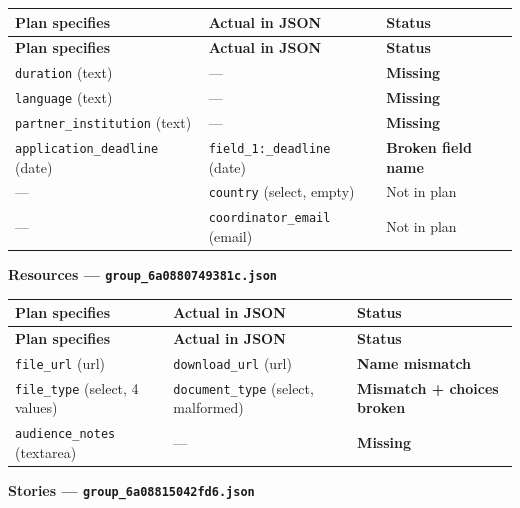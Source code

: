 \documentclass[12pt,a4paper]{article}
\begin{document}
\vspace{0.4em}
\begin{longtable}{@{}p{4cm}p{4.2cm}p{4.1cm}@{}}
\toprule
\rowcolor{uvtLightBlue}
\textbf{Plan specifies} & \textbf{Actual in JSON} & \textbf{Status} \\
\midrule
\endfirsthead
\toprule
\rowcolor{uvtLightBlue}
\textbf{Plan specifies} & \textbf{Actual in JSON} & \textbf{Status} \\
\midrule
\endhead
\bottomrule
\endfoot
\texttt{duration} (text) & --- & \textcolor{statusRed}{\textbf{Missing}} \\
\texttt{language} (text) & --- & \textcolor{statusRed}{\textbf{Missing}} \\
\texttt{partner\_institution} (text) & --- & \textcolor{statusRed}{\textbf{Missing}} \\
\texttt{application\_deadline} (date) & \texttt{field\_1:\_deadline} (date) & \textcolor{statusRed}{\textbf{Broken field name}} \\
--- & \texttt{country} (select, empty) & \textcolor{statusOrange}{Not in plan} \\
--- & \texttt{coordinator\_email} (email) & \textcolor{statusOrange}{Not in plan} \\
\end{longtable}

\vspace{0.8em}
\noindent\textbf{Resources --- \texttt{group\_6a0880749381c.json}}

\vspace{0.4em}
\begin{longtable}{@{}p{4cm}p{4.2cm}p{4.1cm}@{}}
\toprule
\rowcolor{uvtLightBlue}
\textbf{Plan specifies} & \textbf{Actual in JSON} & \textbf{Status} \\
\midrule
\endfirsthead
\toprule
\rowcolor{uvtLightBlue}
\textbf{Plan specifies} & \textbf{Actual in JSON} & \textbf{Status} \\
\midrule
\endhead
\bottomrule
\endfoot
\texttt{file\_url} (url) & \texttt{download\_url} (url) & \textcolor{statusRed}{\textbf{Name mismatch}} \\
\texttt{file\_type} (select, 4 values) & \texttt{document\_type} (select, malformed) & \textcolor{statusRed}{\textbf{Mismatch + choices broken}} \\
\texttt{audience\_notes} (textarea) & --- & \textcolor{statusRed}{\textbf{Missing}} \\
\end{longtable}

\vspace{0.8em}
\noindent\textbf{Stories --- \texttt{group\_6a08815042fd6.json}}
\end{document}
